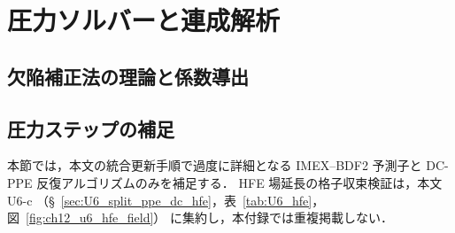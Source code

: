 %

\section{圧力ソルバーと連成解析}
\label{app:pressure_coupling}

\subsection{欠陥補正法の理論と係数導出}
\label{app:dc_theory}




\subsection{圧力ステップの補足}
\label{app:pressure_step_details}

本節では，本文の統合更新手順で過度に詳細となる
IMEX--BDF2 予測子と DC-PPE 反復アルゴリズムのみを補足する．
HFE 場延長の格子収束検証は，本文 U6-c
（§~\ref{sec:U6_split_ppe_dc_hfe}，表~\ref{tab:U6_hfe}，図~\ref{fig:ch12_u6_hfe_field}）
に集約し，本付録では重複掲載しない．




